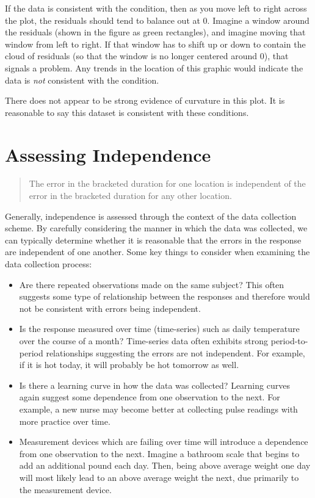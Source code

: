\documentclass[
]{book}
\providecommand{\tightlist}{%
  \setlength{\itemsep}{0pt}\setlength{\parskip}{0pt}}
\theoremstyle{plain}
\theoremstyle{mydefn}
\theoremstyle{myexmpl}
\theoremstyle{remark}
\begin{document}
If the data is consistent with the condition, then as you move left to right across the plot, the residuals should tend to balance out at 0. Imagine a window around the residuals (shown in the figure as green rectangles), and imagine moving that window from left to right. If that window has to shift up or down to contain the cloud of residuals (so that the window is no longer centered around 0), that signals a problem. Any trends in the location of this graphic would indicate the data is \emph{not} consistent with the condition.

There does not appear to be strong evidence of curvature in this plot. It is reasonable to say this dataset is consistent with these conditions.

\hypertarget{assessing-independence}{%
\section{Assessing Independence}\label{assessing-independence}}

\begin{quote}
The error in the bracketed duration for one location is independent of the error in the bracketed duration for any other location.
\end{quote}

Generally, independence is assessed through the context of the data collection scheme. By carefully considering the manner in which the data was collected, we can typically determine whether it is reasonable that the errors in the response are independent of one another. Some key things to consider when examining the data collection process:

\begin{itemize}
\tightlist
\item
  Are there repeated observations made on the same subject? This often suggests some type of relationship between the responses and therefore would not be consistent with errors being independent.
\item
  Is the response measured over time (time-series) such as daily temperature over the course of a month? Time-series data often exhibits strong period-to-period relationships suggesting the errors are not independent. For example, if it is hot today, it will probably be hot tomorrow as well.
\item
  Is there a learning curve in how the data was collected? Learning curves again suggest some dependence from one observation to the next. For example, a new nurse may become better at collecting pulse readings with more practice over time.
\item
  Measurement devices which are failing over time will introduce a dependence from one observation to the next. Imagine a bathroom scale that begins to add an additional pound each day. Then, being above average weight one day will most likely lead to an above average weight the next, due primarily to the measurement device.
\end{itemize}
\end{document}
